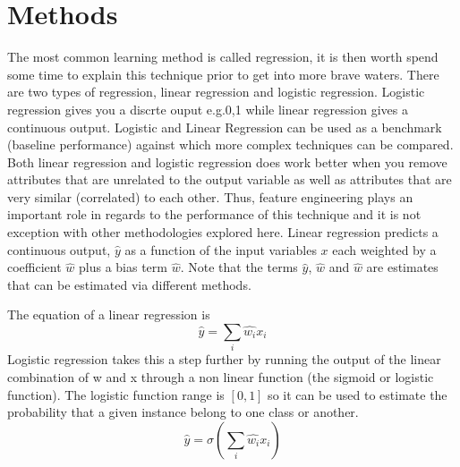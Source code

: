 \documentclass[11pt]{article}
\begin{document}
\section{Methods}
\label{se:me}
The most common learning method is called regression, it is then worth spend some time to explain this technique prior to get into more brave waters. 
There are two types of regression, linear regression and logistic regression. Logistic regression gives you a discrte ouput e.g.0,1 while linear regression gives a continuous output. Logistic and Linear Regression can be used as a benchmark (baseline performance) against which more complex techniques can be compared. 
Both linear regression and logistic regression does work better when you remove attributes that are unrelated to the output variable as well as attributes that are very similar (correlated) to each other. Thus, feature engineering plays an important role in regards to the performance of this technique and it is not exception with other methodologies explored here. 
Linear regression predicts a continuous output, $\hat{y}$ as a function of the input variables $x$ each weighted by a coefficient $\hat{w}$ plus a bias term $\hat{w}$. Note that the terms $\hat{y}$, $\hat{w}$ and $\hat{w}$ are estimates that can be estimated via different methods.

The equation of a linear regression is
\begin{equation}
\hat{y} = \sum_i \hat{w_i}x_i
\end{equation}
Logistic regression takes this a step further by running the output  of the linear combination of w and x through a non linear function (the sigmoid or logistic function). The logistic function range is $[0,1]$ so it can be used to estimate the probability that a given instance belong to one class or another.
\begin{equation}
\hat{y} = \sigma(\sum_i \hat{w_i}x_i)
\end{equation}
\end{document}
